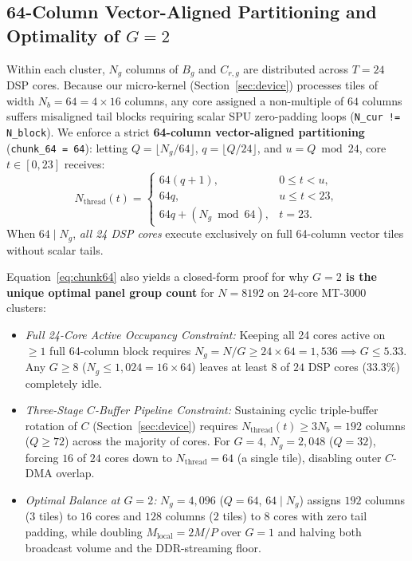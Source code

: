 \documentclass[conference]{IEEEtran}
\begin{document}
\subsection{64-Column Vector-Aligned Partitioning and Optimality of $G=2$}
Within each cluster, $N_g$ columns of $B_g$ and $C_{r,g}$ are distributed across $T = 24$ DSP cores. Because our micro-kernel (Section~\ref{sec:device}) processes tiles of width $N_b = 64 = 4 \times 16$ columns, any core assigned a non-multiple of $64$ columns suffers misaligned tail blocks requiring scalar SPU zero-padding loops (\texttt{N\_cur != N\_block}). We enforce a strict \textbf{64-column vector-aligned partitioning} (\texttt{chunk\_64 = 64}): letting $Q = \lfloor N_g / 64 \rfloor$, $q = \lfloor Q / 24 \rfloor$, and $u = Q \bmod 24$, core $t \in [0, 23]$ receives:
\begin{equation}
N_{\mathrm{thread}}(t) = \begin{cases}
64(q + 1), & 0 \le t < u, \\
64 q, & u \le t < 23, \\
64 q + (N_g \bmod 64), & t = 23.
\end{cases}
\label{eq:chunk64}
\end{equation}
When $64 \mid N_g$, \emph{all 24 DSP cores} execute exclusively on full 64-column vector tiles without scalar tails.

Equation~\eqref{eq:chunk64} also yields a closed-form proof for why \textbf{$G = 2$ is the unique optimal panel group count} for $N = 8192$ on 24-core MT-3000 clusters:
\begin{itemize}\setlength{\itemsep}{1pt}\setlength{\parskip}{0pt}
    \item \emph{Full 24-Core Active Occupancy Constraint:} Keeping all 24 cores active on $\ge 1$ full 64-column block requires $N_g = N/G \ge 24 \times 64 = 1{,}536 \implies G \le 5.33$. Any $G \ge 8$ ($N_g \le 1{,}024 = 16 \times 64$) leaves at least $8$ of $24$ DSP cores ($33.3\%$) completely idle.
    \item \emph{Three-Stage $C$-Buffer Pipeline Constraint:} Sustaining cyclic triple-buffer rotation of $C$ (Section~\ref{sec:device}) requires $N_{\mathrm{thread}}(t) \ge 3 N_b = 192$ columns ($Q \ge 72$) across the majority of cores. For $G = 4$, $N_g = 2{,}048$ ($Q = 32$), forcing $16$ of $24$ cores down to $N_{\mathrm{thread}} = 64$ (a single tile), disabling outer $C$-DMA overlap.
    \item \emph{Optimal Balance at $G = 2$:} $N_g = 4{,}096$ ($Q = 64$, $64 \mid N_g$) assigns $192$ columns ($3$ tiles) to $16$ cores and $128$ columns ($2$ tiles) to $8$ cores with zero tail padding, while doubling $M_{\mathrm{local}} = 2M/P$ over $G=1$ and halving both broadcast volume and the DDR-streaming floor.
\end{itemize}
\end{document}
